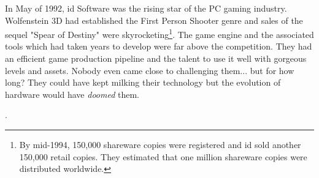 In May of 1992, id Software was the rising star of the PC gaming industry. Wolfenstein 3D had established the First Person Shooter genre and sales of the sequel "Spear of Destiny" were skyrocketing\footnote{By mid-1994, 150,000 shareware copies were registered and id sold another 150,000 retail copies. They estimated that one million shareware copies were distributed worldwide.}. The game engine and the associated tools which had taken years to develop were far above the competition. They had an efficient game production pipeline and the talent to use it well with gorgeous levels and assets. Nobody even came close to challenging them... but for how long? They could have kept milking their technology but the evolution of hardware would have \textit{doomed} them.\\
\par

\par
{}. \\
\par


